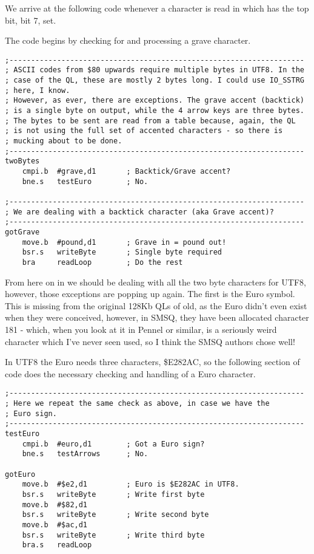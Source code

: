 We arrive at the following code whenever a character is read in which
has the top bit, bit 7, set.

The code begins by checking for and processing a grave character.

\begin{lstlisting}[firstnumber=last,caption={Ql2utf8: Handling exceptions - the Grave/backtick}]
;--------------------------------------------------------------------
; ASCII codes from $80 upwards require multiple bytes in UTF8. In the
; case of the QL, these are mostly 2 bytes long. I could use IO_SSTRG
; here, I know. 
; However, as ever, there are exceptions. The grave accent (backtick)
; is a single byte on output, while the 4 arrow keys are three bytes.
; The bytes to be sent are read from a table because, again, the QL
; is not using the full set of accented characters - so there is
; mucking about to be done.
;--------------------------------------------------------------------
twoBytes
    cmpi.b  #grave,d1       ; Backtick/Grave accent?
    bne.s   testEuro        ; No.

;--------------------------------------------------------------------
; We are dealing with a backtick character (aka Grave accent)?
;--------------------------------------------------------------------
gotGrave
    move.b  #pound,d1       ; Grave in = pound out!
    bsr.s   writeByte       ; Single byte required
    bra     readLoop        ; Do the rest
\end{lstlisting}

From here on in we should be dealing with all the two byte characters
for UTF8, however, those exceptions are popping up again. The first
is the Euro symbol. This is missing from the original 128Kb QLs of
old, as the Euro didn't even exist when they were conceived, however,
in SMSQ, they have been allocated character 181 - which, when you
look at it in Pennel or similar, is a seriously weird character which
I've never seen used, so I think the SMSQ authors chose well!

In UTF8 the Euro needs three characters, \$E282AC, so the following
section of code does the necessary checking and handling of a Euro
character.

\begin{lstlisting}[firstnumber=last,caption={Ql2utf8: Handling exceptions - the Euro Currency symbol}]
;--------------------------------------------------------------------
; Here we repeat the same check as above, in case we have the
; Euro sign.
;--------------------------------------------------------------------
testEuro
    cmpi.b  #euro,d1        ; Got a Euro sign?
    bne.s   testArrows      ; No.

gotEuro
    move.b  #$e2,d1         ; Euro is $E282AC in UTF8.
    bsr.s   writeByte       ; Write first byte
    move.b  #$82,d1
    bsr.s   writeByte       ; Write second byte
    move.b  #$ac,d1
    bsr.s   writeByte       ; Write third byte
    bra.s   readLoop
\end{lstlisting}

